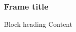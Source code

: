 \documentclass[8pt]{beamer}
\begin{document}
\begin{frame}
\frametitle{Frame title}
\begin{block}{Block heading}
Content
\end{block}
\end{frame}
\end{document}
